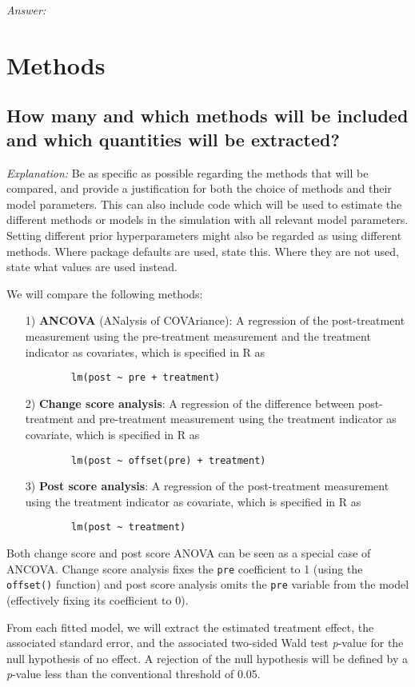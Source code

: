 \documentclass[12pt]{article}
\begin{document}
\textit{Answer:}

\section{Methods}
\subsection{How many and which methods will be included and which quantities will be extracted?}

\textit{Explanation:} Be as specific as possible regarding the methods that will be compared, and provide a justification for both the choice of methods and their model parameters. This can also include code which will be used to estimate the different methods or models in the simulation with all relevant model parameters. Setting different prior hyperparameters might also be regarded as using different methods.  Where package defaults are used, state this. Where they are not used, state what values are used instead.

\begin{examplebox}
We will compare the following methods:
    \begin{itemize}
    \item[1)] \textbf{ANCOVA} (ANalysis of COVAriance): A regression of the post-treatment measurement using the pre-treatment measurement and the treatment indicator as covariates,
    which is specified in R as
    \begin{verbatim}
        lm(post ~ pre + treatment)
    \end{verbatim}

    \item[2)] \textbf{Change score analysis}: A regression of the difference between post-treatment and pre-treatment measurement using the treatment indicator as covariate,
    which is specified in R as
    \begin{verbatim}
        lm(post ~ offset(pre) + treatment)
    \end{verbatim}

    \item[3)] \textbf{Post score analysis}: A regression of the post-treatment measurement using the treatment indicator as covariate,
    which is specified in R as
    \begin{verbatim}
        lm(post ~ treatment)
    \end{verbatim}
\end{itemize}
Both change score and post score ANOVA can be seen as a special case of ANCOVA. Change score analysis fixes the \texttt{pre} coefficient to 1 (using the \texttt{offset()} function) and post score analysis omits the \texttt{pre} variable from the model (effectively fixing its coefficient to 0).

From each fitted model, we will extract the estimated treatment effect, the associated standard error, and the associated two-sided Wald test \textit{p}-value for the null hypothesis of no effect. A rejection of the null hypothesis will be defined by a \textit{p}-value less than the conventional threshold of 0.05.
\end{examplebox}
\end{document}
